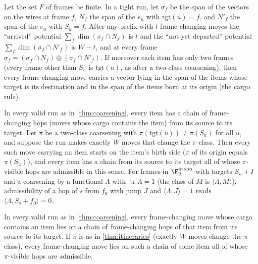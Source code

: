 \begin{theorem}\label{thm:tight}
Let the set $F$ of frames be finite. In a tight run, let $\sigma_f$ be the span of the vectors on the wires at frame $f$, $N_f$ the span of the $e_u$ with $\mathrm{tgt}(u)=f$, and $N'_f$ the span of the $e_u$ with $S_u=f$. After any prefix with $t$ frame-changing moves the ``arrived'' potential $\sum_f\dim(\sigma_f\cap N_f)$ is $t$ and the ``not yet departed'' potential $\sum_f\dim(\sigma_f\cap N'_f)$ is $W-t$, and at every frame $\sigma_f=(\sigma_f\cap N_f)\oplus(\sigma_f\cap N'_f)$. If moreover each item has only two frames (every frame other than $S_u$ is
$\mathrm{tgt}(u)$, as after a two-class coarsening), then every frame-changing move carries a vector lying in the
span of the items whose target is its destination and in the span of the items born at its origin (the cargo rule).
\end{theorem}

\begin{theorem}\label{thm:itineraries}
In every valid run as in \cref{thm:coarsening}, every item has a chain of frame-changing hops (moves whose cargo
contains the item) from its source to its target. Let $\pi$ be a two-class coarsening with
$\pi(\mathrm{tgt}(u))\ne\pi(S_u)$ for all $u$, and suppose the run makes exactly $W$ moves that change the
$\pi$-class. Then every such move carrying an item starts on the item's birth side ($\pi$ of its origin equals
$\pi(S_u)$), and every item has a chain from its source to its target all of whose $\pi$-visible hops are
admissible in this sense. For frames in $\F_2^{m\times m}$ with targets $S_u+I$ and a coarsening by a functional
$\Lambda$ with $\operatorname{tr}\Lambda=1$ (the class of $M$ is $\langle\Lambda,M\rangle$), admissibility of a hop of $s$
from $f_0$ with jump $J$ and $\langle\Lambda,J\rangle=1$ reads $\langle\Lambda,S_s+f_0\rangle=0$.
\end{theorem}

\begin{theorem}\label{thm:carrying}
In every valid run as in \cref{thm:coarsening}, every frame-changing move whose cargo contains an item lies on a chain of frame-changing hops of that item from its source to its target. If $\pi$ is as in \cref{thm:itineraries} (exactly $W$ moves change the $\pi$-class), every frame-changing move lies on such a chain of some item all of whose $\pi$-visible hops are admissible.
\end{theorem}

